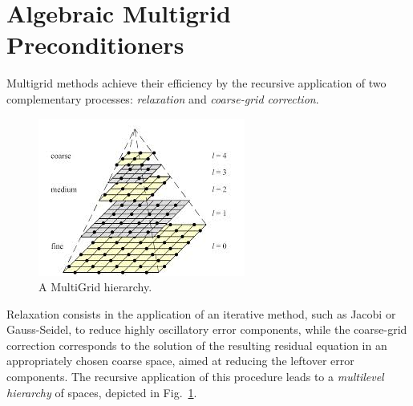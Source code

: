 
\section{Algebraic Multigrid Preconditioners\label{AMG}}
%
Multigrid methods achieve  their efficiency by the recursive application
of two complementary processes: \emph{relaxation} and \emph{coarse-grid
correction}.
%
\begin{figure}[t]
\begin{center}
\includegraphics[width=.75\textwidth]{multilevel.png}
\caption{A MultiGrid hierarchy.\label{hierarchy}}
\end{center}
\end{figure}
%
Relaxation consists in the application of an iterative method, such as
Jacobi or Gauss-Seidel, to reduce highly oscillatory error components,
while the coarse-grid correction corresponds to the solution of the
resulting residual equation in an appropriately chosen coarse space,
aimed at reducing the leftover error components. The recursive application
of this procedure leads to a \emph{multilevel hierarchy} of spaces,
depicted in Fig.~\ref{hierarchy}. 

